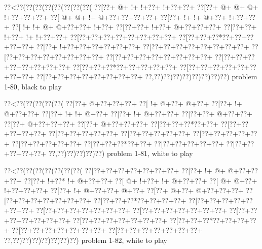 \vbox{\vbox{\goo
\0??<\0??(\0??(\0??(\0??(\0??(\0??(\0??(\0??(
\0??[\0??+\- @+\- !+\- !+\0??+\- !+\0??+\0??+
\0??[\0??+\- @+\- @+\- @+\- !+\0??+\0??+\0??+
\0??[\- @+\- @+\- !+\- @+\0??+\0??+\0??+\0??+
\0??[\0??+\- !+\- !+\- @+\0??+\- !+\0??+\0??+
\0??[\- !+\- !+\- @+\- @+\0??+\0??+\- !+\0??+
\0??[\0??+\0??+\- !+\0??+\- @+\0??+\0??+\0??+
\0??[\0??+\0??+\- !+\0??+\- !+\- !+\0??+\0??+
\0??[\0??+\0??+\0??+\0??+\0??+\0??+\0??+\0??+
\0??[\0??+\0??+\0??*\0??+\0??+\0??+\0??+\0??+
\0??[\0??+\- !+\0??+\0??+\0??+\0??+\0??+\0??+
\0??[\0??+\0??+\0??+\0??+\0??+\0??+\0??+\0??+
\0??[\0??+\0??+\0??+\0??+\0??+\0??+\0??+\0??+
\0??[\0??+\0??+\0??+\0??+\0??+\0??+\0??+\0??+
\0??[\0??+\0??+\0??+\0??+\0??+\0??+\0??+\0??+
\0??[\0??+\0??+\0??*\0??+\0??+\0??+\0??+\0??+
\0??[\0??+\0??+\0??+\0??+\0??+\0??+\0??+\0??+
\0??[\0??+\0??+\0??+\0??+\0??+\0??+\0??+\0??+
\0??,\0??)\0??)\0??)\0??)\0??)\0??)\0??)\0??)
}
\hfil problem 1-80, black to play\hfil\break
}

\vbox{\vbox{\goo
\0??<\0??(\0??(\0??(\0??(\0??(
\0??[\0??+\- @+\0??+\0??+\0??+
\0??[\- !+\- @+\0??+\- @+\0??+
\0??[\0??+\- !+\- @+\0??+\0??+
\0??[\0??+\- !+\- !+\- @+\0??+
\0??[\0??+\- !+\- @+\0??+\0??+
\0??[\0??+\0??+\- @+\0??+\0??+
\0??[\0??+\- @+\0??+\0??+\0??+
\0??[\0??+\- @+\0??+\0??+\0??+
\0??[\0??+\0??+\0??*\0??+\0??+
\0??[\0??+\0??+\0??+\0??+\0??+
\0??[\0??+\0??+\0??+\0??+\0??+
\0??[\0??+\0??+\0??+\0??+\0??+
\0??[\0??+\0??+\0??+\0??+\0??+
\0??[\0??+\0??+\0??+\0??+\0??+
\0??[\0??+\0??+\0??*\0??+\0??+
\0??[\0??+\0??+\0??+\0??+\0??+
\0??[\0??+\0??+\0??+\0??+\0??+
\0??,\0??)\0??)\0??)\0??)\0??)
}
\hfil problem 1-81, white to play\hfil\break
}

\vbox{\vbox{\goo
\0??<\0??(\0??(\0??(\0??(\0??(\0??(\0??(
\0??[\0??+\0??+\0??+\0??+\0??+\0??+\0??+
\0??[\0??+\- !+\- @+\- @+\0??+\0??+\0??+
\0??[\0??+\- !+\0??*\- !+\- @+\0??+\0??+
\0??[\- @+\- !+\0??+\- !+\- @+\0??+\0??+
\0??[\- @+\- @+\0??+\- !+\0??+\0??+\0??+
\0??[\0??+\- !+\- @+\0??+\0??+\- @+\0??+
\0??[\0??+\- @+\0??+\- @+\0??+\0??+\0??+
\0??[\0??+\0??+\0??+\0??+\0??+\0??+\0??+
\0??[\0??+\0??+\0??*\0??+\0??+\0??+\0??+
\0??[\0??+\0??+\0??+\0??+\0??+\0??+\0??+
\0??[\0??+\0??+\0??+\0??+\0??+\0??+\0??+
\0??[\0??+\0??+\0??+\0??+\0??+\0??+\0??+
\0??[\0??+\0??+\0??+\0??+\0??+\0??+\0??+
\0??[\0??+\0??+\0??+\0??+\0??+\0??+\0??+
\0??[\0??+\0??+\0??*\0??+\0??+\0??+\0??+
\0??[\0??+\0??+\0??+\0??+\0??+\0??+\0??+
\0??[\0??+\0??+\0??+\0??+\0??+\0??+\0??+
\0??,\0??)\0??)\0??)\0??)\0??)\0??)\0??)
}
\hfil problem 1-82, white to play\hfil\break
}


